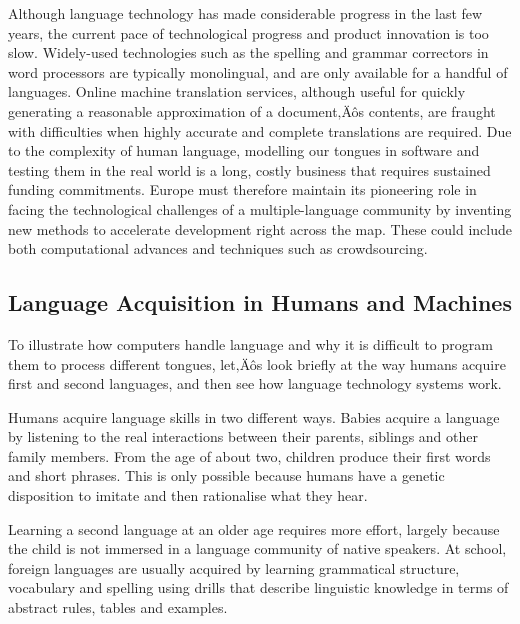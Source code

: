 \begin{multicols}{2}
Although language technology has made considerable progress in the last few years, the current pace of technological progress and product innovation is too slow. Widely-used technologies such as the spelling and grammar correctors in word processors are typically monolingual, and are only available for a handful of languages. Online machine translation services, although useful for quickly generating a reasonable approximation of a document‚Äôs contents, are fraught with difficulties when highly accurate and complete translations are required. Due to the complexity of human language, modelling our tongues in software and testing them in the real world is a long, costly business that requires sustained funding commitments. Europe must therefore maintain its pioneering role in facing the technological challenges of a multiple-language community by inventing new methods to accelerate development right across the map. These could include both computational advances and techniques such as crowdsourcing.


\subsection{Language Acquisition in Humans and Machines}

To illustrate how computers handle language and why it is difficult to program
them to process different tongues, let‚Äôs look briefly at the way humans
acquire first and second languages, and then see how language technology
systems work.

Humans acquire language skills in two different ways. Babies acquire a
language by listening to the real interactions between their parents, siblings
and other family members. From the age of about two, children produce their
first words and short phrases. This is only possible because humans have a
genetic disposition to imitate and then rationalise what they hear. 


Learning a second language at an older age requires more effort, largely
because the child is not immersed in a language community of native
speakers. At school, foreign languages are usually acquired by learning
grammatical structure, vocabulary and spelling using drills that describe
linguistic knowledge in terms of abstract rules, tables and examples.



\end{multicols}
